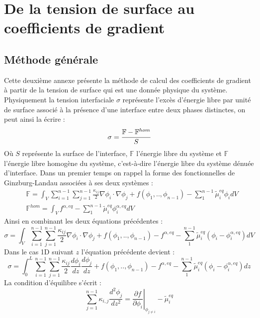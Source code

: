 
\chapter{De la tension de surface au coefficients de gradient}
\section{Méthode générale}
Cette deuxième annexe présente la méthode de calcul des coefficients de gradient à partir de la tension de surface qui est une donnée physique du système. Physiquement la tension interfaciale $\sigma$ représente l'excès d'énergie libre par unité de surface associé à la présence d'une interface entre deux phases distinctes, on peut ainsi la écrire :
\begin{equation}
\sigma = \cfrac{\mathbb{F}-\mathbb{F}^{hom}}{S}
\end{equation}
Où $S$ représente la surface de l'interface, $\mathbb{F}$ l'énergie libre du système et $\mathbb{F}$ l'énergie libre homogène du système, c'est-à-dire l'énergie libre du système dénuée d'interface. 
Dans un premier temps on rappel la forme des fonctionnelles de Ginzburg-Landau associées à ses deux systèmes :
\begin{align*}
&\mathbb{F} = \int_{V}\sum_{i=1}^{n-1}\sum_{j=1}^{n-1}\frac{\kappa_{ij}}{2}\nabla \phi_i \cdot \nabla \phi_j + f(\phi_1,..,\phi_{n-1}) - \sum_{1}^{n-1}\tilde{\mu}_i^{eq}\phi_i dV \\
&\mathbb{F}^{hom} = \int_V f^{\alpha,eq}  - \sum_{1}^{n-1}\tilde{\mu}_i^{eq}\phi_i^{\alpha,eq} dV 
\end{align*}
Ainsi en combinant les deux équations précédentes : 
\begin{equation}
\sigma = \int_{V}\sum_{i=1}^{n-1}\sum_{j=1}^{n-1}\frac{\kappa_{ij}}{2}\nabla \phi_i \cdot \nabla \phi_j + f(\phi_1,..,\phi_{n-1}) - f^{\alpha,eq} - \sum_{1}^{n-1}\tilde{\mu}_i^{eq}(\phi_i-\phi_i^{\alpha,eq}) dV
\end{equation}
Dans le cas 1D suivant $z$ l'équation précédente devient : 
\begin{equation}
\sigma = \int_{0}^L\sum_{i=1}^{n-1}\sum_{j=1}^{n-1}\frac{\kappa_{ij}}{2}\frac{ d\phi_i}{dz} \frac{ d\phi_j}{dz} + f(\phi_1,..,\phi_{n-1}) - f^{\alpha,eq} - \sum_{1}^{n-1}\tilde{\mu}_i^{eq}(\phi_i-\phi_i^{\alpha,eq}) dz
\end{equation}
La condition d'équilibre s'écrit :
\begin{equation}
\sum_{j=1}^{n-1} \kappa_{i,j} \frac{d^2\phi_j}{dz^2} = \left.\frac{\partial f}{\partial \phi_i}\right|_{\phi_{j\neq i}} - \tilde{\mu}_i^{eq}
\end{equation}
